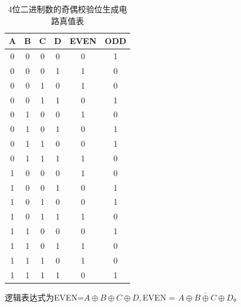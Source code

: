 \documentclass{article}
\begin{document}
    \begin{table}[H]
    \centering
    \begin{tabular}{|c c c c|c c|}
        \hline
        A & B & C & D & EVEN & ODD  \\ \hline
        0 & 0 & 0 & 0 & 0 & 1  \\ \hline
        0 & 0 & 0 & 1 & 1 & 0  \\ \hline
        0 & 0 & 1 & 0 & 1 & 0  \\ \hline
        0 & 0 & 1 & 1 & 0 & 1  \\ \hline
        0 & 1 & 0 & 0 & 1 & 0  \\ \hline
        0 & 1 & 0 & 1 & 0 & 1  \\ \hline
        0 & 1 & 1 & 0 & 0 & 1  \\ \hline
        0 & 1 & 1 & 1 & 1 & 0  \\ \hline
        1 & 0 & 0 & 0 & 1 & 0  \\ \hline
        1 & 0 & 0 & 1 & 0 & 1  \\ \hline
        1 & 0 & 1 & 0 & 0 & 1  \\ \hline
        1 & 0 & 1 & 1 & 1 & 0  \\ \hline
        1 & 1 & 0 & 0 & 0 & 1  \\ \hline
        1 & 1 & 0 & 1 & 1 & 0  \\ \hline
        1 & 1 & 1 & 0 & 1 & 0  \\ \hline
        1 & 1 & 1 & 1 & 0 & 1  \\ \hline
    \end{tabular}
    \caption{4位二进制数的奇偶校验位生成电路真值表}
    \end{table}
    逻辑表达式为EVEN=$A\oplus B\oplus C\oplus D,$EVEN = $\overline{A\oplus B\oplus C\oplus D}  $。
\end{document}
